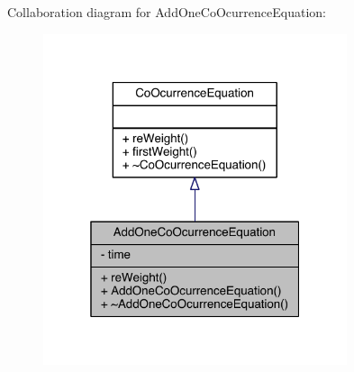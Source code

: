 Collaboration diagram for Add\+One\+Co\+Ocurrence\+Equation\+:
\nopagebreak
\begin{figure}[H]
\begin{center}
\leavevmode
\includegraphics[width=253pt]{class_add_one_co_ocurrence_equation__coll__graph}
\end{center}
\end{figure}


